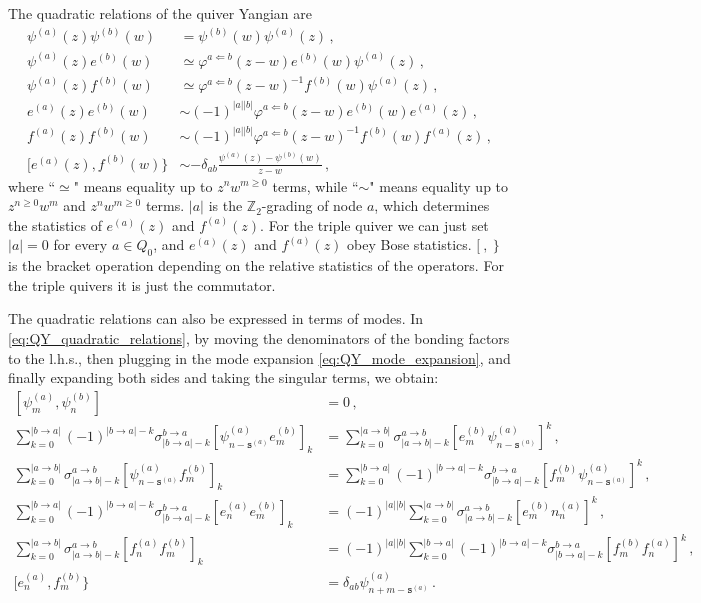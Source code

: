 \documentclass[12pt,a4paper]{article}
\renewcommand{\(}{\left(}
\renewcommand{\)}{\right)}
\renewcommand{\(}{\left(}
\renewcommand{\)}{\right)}
\begin{document}
The quadratic relations of the quiver Yangian are \cite{Li:2020rij,Li:2023zub}
\begin{equation}\label{eq:QY_quadratic_relations}
	\begin{aligned}
		\psi^{(a)}(z)\psi^{(b)}(w)&=\psi^{(b)}(w)\psi^{(a)}(z)\,,\\
		\psi^{(a)}(z)e^{(b)}(w)&\simeq \varphi^{a\Leftarrow b}(z-w)e^{(b)}(w)\psi^{(a)}(z)\,,\\
		\psi^{(a)}(z)f^{(b)}(w)&\simeq \varphi^{a\Leftarrow b}(z-w)^{-1}f^{(b)}(w)\psi^{(a)}(z)\,,\\
		e^{(a)}(z)e^{(b)}(w)&\sim (-1)^{|a||b|}\varphi^{a\Leftarrow b}(z-w)e^{(b)}(w)e^{(a)}(z)\,,\\
		f^{(a)}(z)f^{(b)}(w)&\sim (-1)^{|a||b|}\varphi^{a\Leftarrow b}(z-w)^{-1}f^{(b)}(w)f^{(a)}(z)\,,\\
		[e^{(a)}(z), f^{(b)}(w)\}&\sim -\delta_{ab}\frac{\psi^{(a)}(z)-\psi^{(b)}(w)}{z-w}\,,
	\end{aligned}
\end{equation}
\noindent where ``$\simeq$" means equality up to $z^nw^{m\geq0}$ terms, while ``$\sim$" means equality up to $z^{n\geq 0}w^{m}$ and $z^nw^{m\geq0}$ terms. 
$|a|$ is the $\mathbb{Z}_2$-grading of node $a$, which determines the statistics of $e^{(a)}(z)$ and $f^{(a)}(z)$. 
For the triple quiver we can just set $|a|=0$ for every $a\in Q_0$, and $e^{(a)}(z)$ and $f^{(a)}(z)$ obey Bose statistics. 
$[\ ,\ \}$ is the bracket operation depending on the relative statistics of the operators. 
For the triple quivers it is just the commutator. 

The quadratic relations can also be expressed in terms of modes. 
In \eqref{eq:QY_quadratic_relations}, by moving the denominators of the bonding factors to the l.h.s., then plugging in the mode expansion \eqref{eq:QY_mode_expansion}, and finally expanding both sides and taking the singular terms, we obtain:
\small{
\begin{equation}\label{eq:QY_mode_relation}
\begin{aligned}
[\psi^{(a)}_m,\psi^{(b)}_n]&=0\,,\\
\sum_{k=0}^{|b\to a|}(-1)^{|b\to a|-k}\sigma^{b\to a}_{|b\to a|-k}[\psi^{(a)}_{n-\mathtt{s}^{(a)}}e^{(b)}_m]_k&=\sum_{k=0}^{|a\to b|}\sigma^{a\to b}_{|a\to b|-k}[e^{(b)}_m \psi^{(a)}_{n-\mathtt{s}^{(a)}}]^k\,,\\
\sum_{k=0}^{|a\to b|}\sigma^{a\to b}_{|a\to b|-k}[\psi^{(a)}_{n-\mathtt{s}^{(a)}}f^{(b)}_m]_k&=\sum_{k=0}^{|b\to a|}(-1)^{|b\to a|-k}\sigma^{b\to a}_{|b\to a|-k}[f^{(b)}_m \psi^{(a)}_{n-\mathtt{s}^{(a)}}]^k\,,\\
\sum_{k=0}^{|b\to a|}(-1)^{|b\to a|-k}\sigma^{b\to a}_{|b\to a|-k}[e^{(a)}_n e^{(b)}_m]_k&=(-1)^{|a||b|}\sum_{k=0}^{|a\to b|}\sigma^{a\to b}_{|a\to b|-k}[e^{(b)}_m n^{(a)}_n]^k\,,\\
\sum_{k=0}^{|a\to b|}\sigma^{a\to b}_{|a\to b|-k}[f^{(a)}_n f^{(b)}_m]_k&=(-1)^{|a||b|}\sum_{k=0}^{|b\to a|}(-1)^{|b\to a|-k}\sigma^{b\to a}_{|b\to a|-k}[f^{(b)}_m f^{(a)}_n]^k\,,\\
[e^{(a)}_n,f^{(b)}_m\}&=\delta_{ab}\psi^{(a)}_{n+m-\mathtt{s}^{(a)}}\,.
\end{aligned}
\end{equation}}
\end{document}
